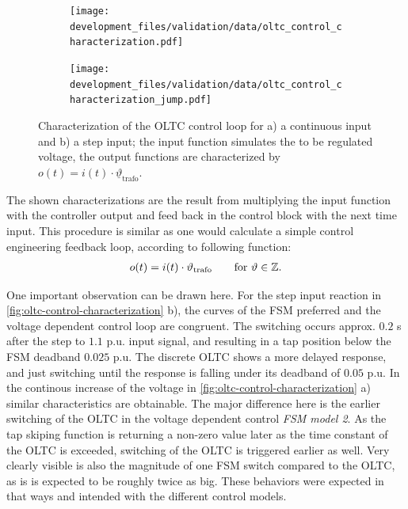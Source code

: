 \begin{figure}[htbp!]
        \centering
        \begin{subfigure}[b]{.49\linewidth}
                \centering
                \texttt{[image: development\_files/validation/data/oltc\_control\_characterization.pdf]}
        \end{subfigure}
        \begin{subfigure}[b]{.49\linewidth}
                \centering
                \texttt{[image: development\_files/validation/data/oltc\_control\_characterization\_jump.pdf]}
        \end{subfigure}
        \caption[Characterization of the OLTC control loops]{Characterization of the OLTC control loop for a) a continuous input and b) a step input; the input function simulates the to be regulated voltage, the output functions are characterized by $o(t)=i(t) \cdot \underline{\vartheta}_\mathrm{trafo}$.}
        \label{fig:oltc-control-characterization}
\end{figure}

The shown characterizations are the result from multiplying the input function with the controller output and feed back in the control block with the next time input.
This procedure is similar as one would calculate a simple control engineering feedback loop, according to following function:
\begin{align}
        o(t)=i(t) \cdot \vartheta_\mathrm{trafo} \quad\quad \text{for }\vartheta \in \mathbb{Z}. \notag
\end{align}

One important observation can be drawn here.
For the step input reaction in \autoref{fig:oltc-control-characterization} b), the curves of the \acs{FSM} preferred and the voltage dependent control loop are congruent.
The switching occurs approx. $0.2$ s after the step to $1.1$ p.u. input signal, and resulting in a tap position below the \acs{FSM} deadband $0.025$ p.u.
The discrete \acs{OLTC} shows a more delayed response, and just switching until the response is falling under its deadband of $0.05$ p.u.
In the continous increase of the voltage in \autoref{fig:oltc-control-characterization} a) similar characteristics are obtainable.
The major difference here is the earlier switching of the \acs{OLTC} in the voltage dependent control \textit{FSM model 2}.
As the tap skiping function is returning a non-zero value later as the time constant of the \acs{OLTC} is exceeded, switching of the \acs{OLTC} is triggered earlier as well.
Very clearly visible is also the magnitude of one \acs{FSM} switch compared to the \acs{OLTC}, as is is expected to be roughly twice as big.
These behaviors were expected in that ways and intended with the different control models.

